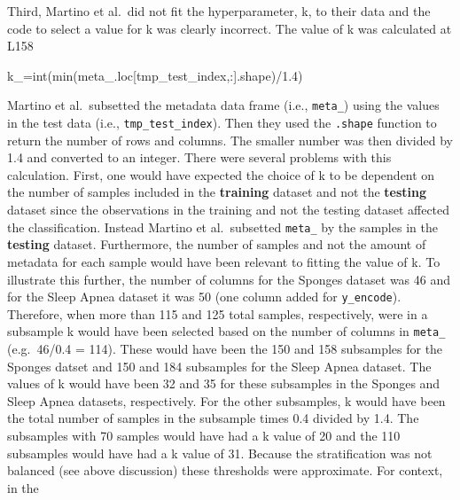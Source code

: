 \documentclass[
]{article}
\newenvironment{Shaded}{}{}
\newcommand{\BuiltInTok}[1]{\textcolor[rgb]{0.65,0.15,0.64}{#1}}
\newcommand{\FloatTok}[1]{\textcolor[rgb]{0.60,0.41,0.00}{#1}}
\newcommand{\NormalTok}[1]{\textcolor[rgb]{0.22,0.23,0.26}{#1}}
\newcommand{\OperatorTok}[1]{\textcolor[rgb]{0.65,0.15,0.64}{#1}}
\begin{document}
Third, Martino et al.~did not fit the hyperparameter, k, to their data
and the code to select a value for k was clearly incorrect. The value of
k was calculated at L158

\footnotesize

\begin{Shaded}
\begin{Highlighting}[numbers=left,,firstnumber=158,]
\NormalTok{k\_}\OperatorTok{=}\BuiltInTok{int}\NormalTok{(}\BuiltInTok{min}\NormalTok{(meta\_.loc[tmp\_test\_index,:].shape)}\OperatorTok{/}\FloatTok{1.4}\NormalTok{)}
\end{Highlighting}
\end{Shaded}

\normalsize{}

Martino et al.~subsetted the metadata data frame (i.e., \texttt{meta\_})
using the values in the test data (i.e., \texttt{tmp\_test\_index}).
Then they used the \texttt{.shape} function to return the number of rows
and columns. The smaller number was then divided by 1.4 and converted to
an integer. There were several problems with this calculation. First,
one would have expected the choice of k to be dependent on the number of
samples included in the \textbf{training} dataset and not the
\textbf{testing} dataset since the observations in the training and not
the testing dataset affected the classification. Instead Martino et
al.~subsetted \texttt{meta\_} by the samples in the \textbf{testing}
dataset. Furthermore, the number of samples and not the amount of
metadata for each sample would have been relevant to fitting the value
of k. To illustrate this further, the number of columns for the Sponges
dataset was 46 and for the Sleep Apnea dataset it was 50 (one column
added for \texttt{y\_encode}). Therefore, when more than 115 and 125
total samples, respectively, were in a subsample k would have been
selected based on the number of columns in \texttt{meta\_} (e.g.~46/0.4
= 114). These would have been the 150 and 158 subsamples for the Sponges
datset and 150 and 184 subsamples for the Sleep Apnea dataset. The
values of k would have been 32 and 35 for these subsamples in the
Sponges and Sleep Apnea datasets, respectively. For the other
subsamples, k would have been the total number of samples in the
subsample times 0.4 divided by 1.4. The subsamples with 70 samples would
have had a k value of 20 and the 110 subsamples would have had a k value
of 31. Because the stratification was not balanced (see above
discussion) these thresholds were approximate. For context, in the
\end{document}
